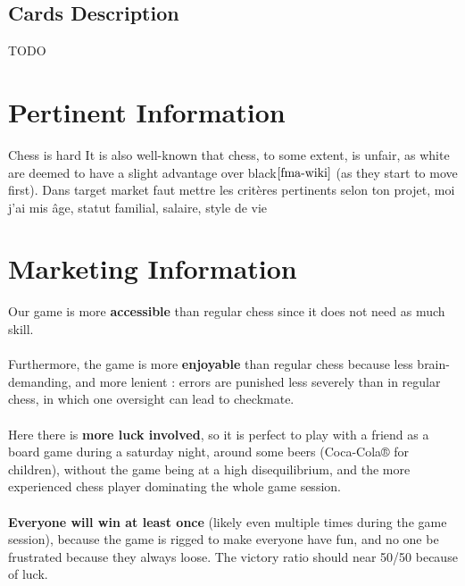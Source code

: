 \documentclass[12pt]{article}
\begin{document}
        \subsection{Cards Description}
            TODO
    
    \section{Pertinent Information}
        Chess is hard
        It is also well-known that chess, to some extent, is unfair, as white are deemed to have a slight advantage over black$\cite{fma-wiki}$  (as they start to move first).
        Dans target market faut mettre les critères pertinents selon ton projet, moi j'ai mis âge, statut familial, salaire, style de vie
    
    \section{Marketing Information}
        Our game is more \textbf{accessible} than regular chess since it does not need as much skill.
        \\\\Furthermore, the game is more \textbf{enjoyable} than regular chess because less brain-demanding, and more lenient : errors are punished less severely than in regular chess, in which one oversight can lead to checkmate.
        \\\\Here there is \textbf{more luck involved}, so it is perfect to play with a friend as a board game during a saturday night, around some beers (Coca-Cola® for children), without the game being at a high disequilibrium, and the more experienced chess player dominating the whole game session.
        \\\\\textbf{Everyone will win at least once} (likely even multiple times during the game session), because the game is rigged to make everyone have fun, and no one be frustrated because they always loose. The victory ratio should near 50/50 because of luck.

    
\end{document}
